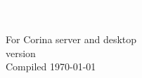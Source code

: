
\cleardoublepage
\thispagestyle{empty} 
\includegraphics{Images/pixel.png}

\newpage
\thispagestyle{empty} 
\includegraphics{Images/pixel.png}\\[187mm] 
\vfill
{
\large For Corina server and desktop\\
version \versionnumber\\[2mm]
Compiled \today\\[4mm]
}
